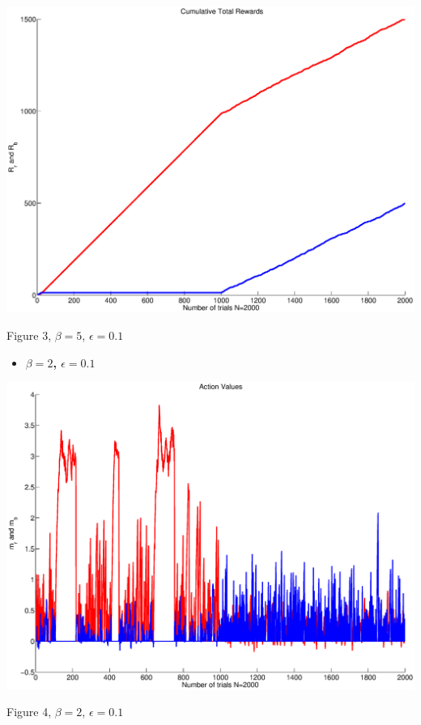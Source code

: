 \documentclass{article}
\begin{document}
\begin{center}
\includegraphics[width=\textwidth]{rew1.eps}
\begin{footnotesize}
 Figure 3, $\beta=5$, $\epsilon=0.1$
\end{footnotesize}
\end{center}

\newpage
\begin{itemize}
 \item \textbf{ $\beta=2$, $\epsilon=0.1$}
\end{itemize}

\begin{center}
\includegraphics[width=\textwidth]{action2.eps}
\begin{footnotesize}
 Figure 4, $\beta=2$, $\epsilon=0.1$
\end{footnotesize}
\end{center}
\end{document}
